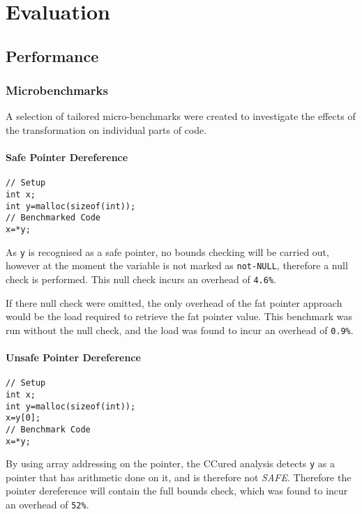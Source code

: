 \chapter{Evaluation}

\section{Performance}
\subsection{Microbenchmarks}

A selection of tailored micro-benchmarks were created to investigate the effects of the transformation on individual parts of code.

\subsubsection{Safe Pointer Dereference}

\begin{verbatim}
// Setup
int x;
int y=malloc(sizeof(int));
// Benchmarked Code
x=*y;
\end{verbatim}

As \verb!y! is recognised as a safe pointer, no bounds checking will be carried out, however at the moment the variable is not marked as \verb!not-NULL!, therefore a null check is performed.
This null check incurs an overhead of \verb!4.6%!.

If there null check were omitted, the only overhead of the fat pointer approach would be the load required to retrieve the fat pointer value.
This benchmark was run without the null check, and the load was found to incur an overhead of \verb!0.9%!.

\subsubsection{Unsafe Pointer Dereference}

\begin{verbatim}
// Setup
int x;
int y=malloc(sizeof(int));
x=y[0];
// Benchmark Code
x=*y;
\end{verbatim}

By using array addressing on the pointer, the CCured analysis detects \verb!y! as a pointer that has arithmetic done on it, and is therefore not \textit{SAFE}.
Therefore the pointer dereference will contain the full bounds check, which was found to incur an overhead of \verb!52%!.

